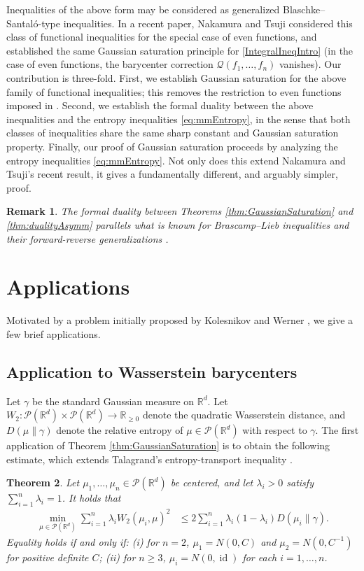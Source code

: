 \documentclass[10pt]{article}
\newtheorem{theorem}{Theorem}
\newtheorem{remark}[theorem]{Remark}
\newcommand{\id}{\operatorname{id}}
\begin{document}
 Inequalities of the above form may be considered as generalized Blaschke--Santal\'o-type inequalities.  In a recent paper, Nakamura and Tsuji \cite{NT} considered this class of functional inequalities for the special case of even functions, and established the same Gaussian saturation principle for \eqref{IntegralIneqIntro} (in the case of even functions, the barycenter correction $\mathcal{Q}(f_1, \dots, f_n)$ vanishes).  Our contribution is three-fold.  First, we establish Gaussian saturation for the above family of functional inequalities; this removes the restriction to even functions imposed in \cite[Theorem 1.1]{NT}.  Second, we establish the formal duality between the above inequalities and the entropy inequalities \eqref{eq:mmEntropy}, in the sense that both classes of inequalities share the same sharp constant and Gaussian saturation property.  Finally,  our proof of Gaussian saturation proceeds by analyzing the entropy inequalities \eqref{eq:mmEntropy}.  Not only does this extend Nakamura and Tsuji's recent result, it gives a fundamentally different, and arguably simpler, proof.  
 
 \begin{remark}
The formal duality between Theorems \ref{thm:GaussianSaturation} and \ref{thm:dualityAsymm} parallels what is known for Brascamp--Lieb inequalities \cite{carlen2009subadditivity} and their forward-reverse generalizations \cite{CL21, LCCV}.  
\end{remark}
 
 
 \section{Applications}
 Motivated by a problem initially proposed by Kolesnikov and Werner \cite{KW}, we give a few brief applications.
 \subsection{Application to Wasserstein barycenters}
 Let $\gamma$ be the standard Gaussian measure on $\mathbb{R}^d$.  Let $W_2 : \mathcal{P}(\mathbb{R}^d) \times  \mathcal{P}(\mathbb{R}^d) \to \mathbb{R}_{\geq 0}$ denote the quadratic Wasserstein distance, and $D(\mu \| \gamma)$ denote the relative entropy of $\mu \in \mathcal{P}(\mathbb{R}^d)$ with respect to $\gamma$.   The first   application of Theorem \ref{thm:GaussianSaturation} is to obtain the following estimate,  which extends    Talagrand's  entropy-transport inequality \cite{Tal}.
 \begin{theorem}\label{thm:BaryTal} Let $\mu_1, \dots, \mu_n \in \mathcal{P}(\mathbb{R}^d)$ be centered, and let $\lambda_i >  0$ satisfy $\sum_{i=1}^n \lambda_i = 1$.  It holds that  
\begin{align}
  \min_{\mu \in \mathcal{P}(\mathbb{R}^d)}   \sum_{i=1}^n  \lambda_i W_2(\mu_i,\mu)^2  &\leq  2  \sum_{i=1}^n  \lambda_i (1- \lambda_i ) D(\mu_i \| \gamma). \label{eq:TalBarycenter}
\end{align}
Equality holds if and only if: (i) for $n=2$, $\mu_1 = N(0,C)$ and $\mu_2 = N(0,C^{-1})$ for positive definite $C$; (ii) for $n\geq 3$,  $\mu_i  = N(0,\id)$ for each $i=1,\dots, n$.  
\end{theorem}
\end{document}
